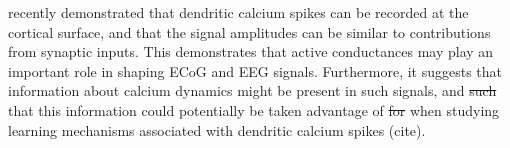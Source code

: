 \documentclass[preprint,10pt,authoryear]{elsarticle}
\newcommand{\hlb}[2][NavyBlue]{ {\sethlcolor{#1} \hl{#2}} }
\newcommand{\hlg}[2][Emerald]{ {\sethlcolor{#1} \hl{#2}} }
\newcommand{\snnote}[1]{\color{white}{\hlb{SN: #1 }}\color{black}}
\newcommand{\sntxt}[1]{{\color{NavyBlue}#1}}
\newcommand{\tvnnote}[1]{\color{white}{\hlg{TVN: #1 }}\color{black}}
\newcommand{\tvntxt}[1]{{\color{Emerald}#1}}
\begin{document}
%

\cite{SUZUKI2017} recently demonstrated that dendritic calcium spikes can be recorded at the cortical surface, and that the signal amplitudes can be similar to contributions from synaptic inputs.
This demonstrates that active conductances may play an important role in shaping ECoG and EEG signals. Furthermore, it suggests that information about calcium dynamics might be present in such signals, and \sntxt{\sout{such} that this} information could potentially be taken advantage of \sntxt{\sout{for} when} studying learning mechanisms associated with dendritic calcium spikes (cite).
\end{document}
